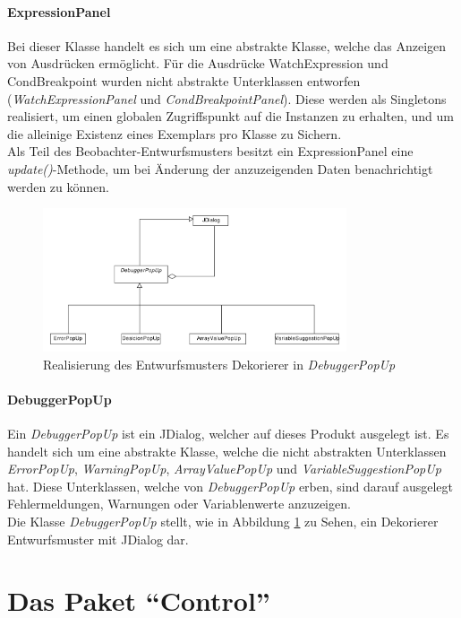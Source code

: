 \documentclass[parskip=full]{scrartcl}
\begin{document}
\paragraph{ExpressionPanel}
Bei dieser Klasse handelt es sich um eine abstrakte Klasse, welche das Anzeigen von Ausdrücken ermöglicht. Für die Ausdrücke WatchExpression und CondBreakpoint wurden nicht abstrakte Unterklassen entworfen (\textit{WatchExpressionPanel} und \textit{CondBreakpointPanel}). Diese werden als Singletons realisiert, um einen globalen Zugriffspunkt auf die Instanzen zu erhalten, und um die alleinige Existenz eines Exemplars pro Klasse zu Sichern. \\
Als Teil des Beobachter-Entwurfsmusters besitzt ein ExpressionPanel eine \textit{update()}-Methode, um bei Änderung der anzuzeigenden Daten benachrichtigt werden zu können.
\begin{figure}[!h]
\centering
\includegraphics[width=0.8\textwidth]{diagrammIdeenUmlet/GUIDekorierer.pdf}
\caption{Realisierung des Entwurfsmusters Dekorierer in \textit{DebuggerPopUp}}
\label{guidekorierer}
\end{figure}
\paragraph{DebuggerPopUp}
Ein \textit{DebuggerPopUp} ist ein JDialog, welcher auf dieses Produkt ausgelegt ist. Es handelt sich um eine abstrakte Klasse, welche die nicht abstrakten Unterklassen \textit{ErrorPopUp}, \textit{WarningPopUp}, \textit{ArrayValuePopUp} und \textit{VariableSuggestionPopUp} hat. Diese Unterklassen, welche von \textit{DebuggerPopUp} erben, sind darauf ausgelegt Fehlermeldungen, Warnungen oder Variablenwerte anzuzeigen. \\ 
Die Klasse \textit{DebuggerPopUp} stellt, wie in Abbildung \ref{guidekorierer} zu Sehen, ein Dekorierer Entwurfsmuster mit JDialog dar.

\section{Das Paket \enquote{Control}}
\label{Control}
\end{document}
